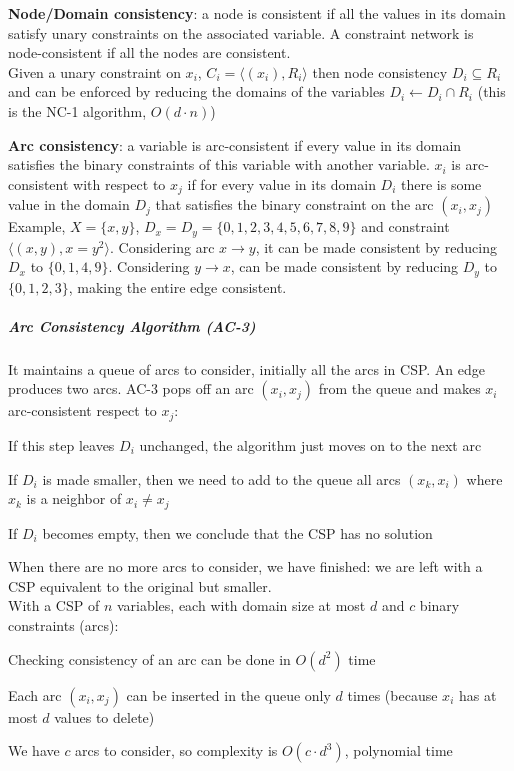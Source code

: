 \documentclass[10pt]{report}
\begin{document}
\begin{list}{}{} 
	\item \textbf{Node/Domain consistency}: a node is consistent if all the values in its domain satisfy unary constraints on the associated variable. A constraint network is node-consistent if all the nodes are consistent.\\
	Given a unary constraint on $x_i$, $C_i = \langle(x_i), R_i\rangle$ then node consistency $D_i \subseteq R_i$ and can be enforced by reducing the domains of the variables $D_i \leftarrow D_i \cap R_i$ (this is the NC-1 algorithm, $O(d\cdot n)$)
	\item \textbf{Arc consistency}: a variable is arc-consistent if every value in its domain satisfies the binary constraints of this variable with another variable. $x_i$ is arc-consistent with respect to $x_j$ if for every value in its domain $D_i$ there is some value in the domain $D_j$ that satisfies the binary constraint on the arc $(x_i, x_j)$\\
	Example, $X = \{x, y\}$, $D_x = D_y = \{0,1,2,3,4,5,6,7,8,9\}$ and constraint $\langle(x,y), x=y^2\rangle$. Considering arc $x \rightarrow y$, it can be made consistent by reducing $D_x$ to $\{0,1,4,9\}$. Considering $y \rightarrow x$, can be made consistent by reducing $D_y$ to $\{0,1,2,3\}$, making the entire edge consistent.
\end{list}
\subparagraph{Arc Consistency Algorithm (AC-3)} It maintains a queue of arcs to consider, initially all the arcs in CSP. An edge produces two arcs. AC-3 pops off an arc $(x_i, x_j)$ from the queue and makes $x_i$ arc-consistent respect to $x_j$: \begin{list}{}{}
	\item If this step leaves $D_i$ unchanged, the algorithm just moves on to the next arc
	\item If $D_i$ is made smaller, then we need to add to the queue all arcs $(x_k, x_i)$ where $x_k$ is a neighbor of $x_i \neq x_j$
	\item If $D_i$ becomes empty, then we conclude that the CSP has no solution
\end{list}
When there are no more arcs to consider, we have finished: we are left with a CSP equivalent to the original but smaller.\\
With a CSP of $n$ variables, each with domain size at most $d$ and $c$ binary constraints (arcs):
\begin{list}{}{}
	\item Checking consistency of an arc can be done in $O(d^2)$ time
	\item Each arc $(x_i, x_j)$ can be inserted in the queue only $d$ times (because $x_i$ has at most $d$ values to delete)
	\item We have $c$ arcs to consider, so complexity is $O(c\cdot d^3)$, polynomial time
\end{list}
\end{document}
